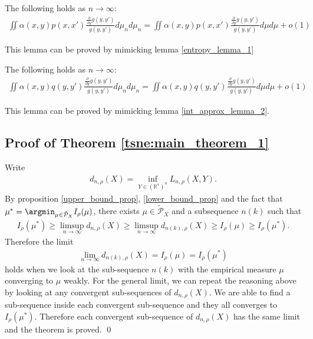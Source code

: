 \begin{lemma} \label{appendix_lemma_1}
    The following holds as $n \to \infty$:
    \begin{align}
        \iint \alpha(x,y)p(x,x') \frac{\frac{\partial}{\partial y}g(y,y')}{g(y,y')} d\mu_n d\mu_n = \iint \alpha(x,y)p(x,x') \frac{\frac{\partial}{\partial y}g(y,y')}{g(y,y')} d\mu d\mu + o(1)
    \end{align}
\end{lemma}
This lemma can be proved by mimicking lemma \ref{entropy_lemma_1}
\begin{lemma} \label{appendix_lemma_2}
    The following holds as $n \to \infty$:
    \begin{align}
        \iint \alpha(x,y)q(y,y') \frac{\frac{\partial}{\partial y}g(y,y')}{g(y,y')} d\mu_n d\mu_n = \iint \alpha(x,y)q(y,y') \frac{\frac{\partial}{\partial y}g(y,y')}{g(y,y')} d\mu d\mu + o(1)
    \end{align}
\end{lemma}
This lemma can be proved by mimicking lemma \ref{int_approx_lemma_2}.
\subsection{Proof of Theorem \ref{tsne:main_theorem_1}} \label{tsne:sec:main_theorem_1}
Write
\begin{align}
    d_{n,\rho}(X) = \inf_{Y \in (\mathbb{R}^s)^n}L_{n,\rho}(X,Y).
\end{align}
By proposition \ref{upper_bound_prop}, \ref{lower_bound_prop} and the fact that $\mu^* = \argmin_{\mu \in \tilde{\mathcal{P}}_X} I_{\rho}(\mu)$, there exists $\mu \in \tilde{\mathcal{P}}_X$ and a subsequence $n(k)$ such that
\begin{align}
    I_{\rho}(\mu^*) \geq \limsup_{n \to \infty} d_{n,\rho}(X) \geq \limsup_{n \to \infty} d_{n(k),\rho}(X) \geq I_{\rho}(\mu) \geq I_{\rho}(\mu^*).
\end{align}
Therefore the limit
\begin{align}
    \lim_{n \to \infty} d_{n(k),\rho}(X) = I_{\rho}(\mu) = I_{\rho}(\mu^*)
\end{align}
holds when we look at the sub-sequence $n(k)$ with the empirical measure $\mu$ converging to $\mu$ weakly. For the general limit, we can repeat the reasoning above by looking at any convergent sub-sequences of $d_{n,\rho}(X)$. We are able to find a sub-sequence inside each convergent sub-sequence and they all converges to $I_{\rho}(\mu^*)$. Therefore each convergent sub-sequence of $d_{n,\rho}(X)$ has the same limit and the theorem is proved. \qed

